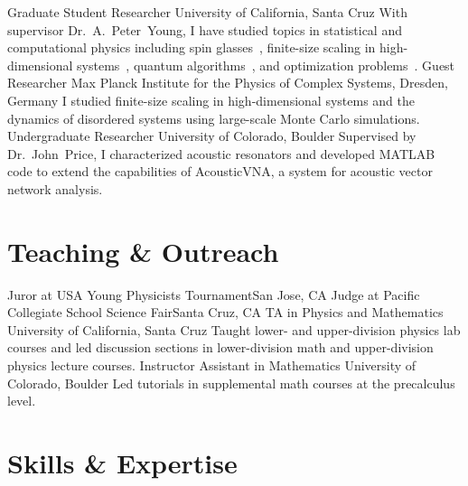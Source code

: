 \documentclass{cv}
\def\Peter{Dr.~A.~Peter~Young}
\def\John{Dr.~John~Price}
\begin{document}
\begin{cvjobs}
    {Graduate Student Researcher}
    {University of California, Santa Cruz}
    {With supervisor \Peter, I have studied topics in statistical and
     computational physics including
     spin glasses~\cite{wittmann2014low,wittmann2012spin,wittmann2013low},
     finite-size scaling in high-dimensional systems~\cite{wittmann2014finite},
     quantum algorithms~\cite{wittmann2014distinguishing,wittmann2014scheduling},
     and optimization problems~\cite{wittmann2014scheduling}.}
    {Guest Researcher}
    {Max Planck Institute for the Physics of Complex Systems, Dresden, Germany}
    {I studied finite-size scaling in high-dimensional systems and the
     dynamics of disordered systems using large-scale Monte Carlo simulations.}
    {Undergraduate Researcher}
    {University of Colorado, Boulder}
    {Supervised by \John{}, I characterized acoustic resonators and developed
     MATLAB code to extend the capabilities of AcousticVNA, a system for acoustic
     vector network analysis.}
\end{cvjobs}

\section{Teaching \& Outreach}

\begin{cvjobs}
    {Juror at USA Young Physicists Tournament}{San Jose, CA}{}
  \cvjob{}{}
    {Judge at Pacific Collegiate School Science Fair}{Santa Cruz, CA}{}
    {TA in Physics and Mathematics}
    {University of California, Santa Cruz}
    {Taught lower- and upper-division physics lab courses and led discussion sections in
     lower-division math and upper-division physics lecture courses.}
    {Instructor Assistant in Mathematics}
    {University of Colorado, Boulder}
    {Led tutorials in supplemental math courses at the precalculus level.}
\end{cvjobs}

\section{Skills \& Expertise}
\end{document}
